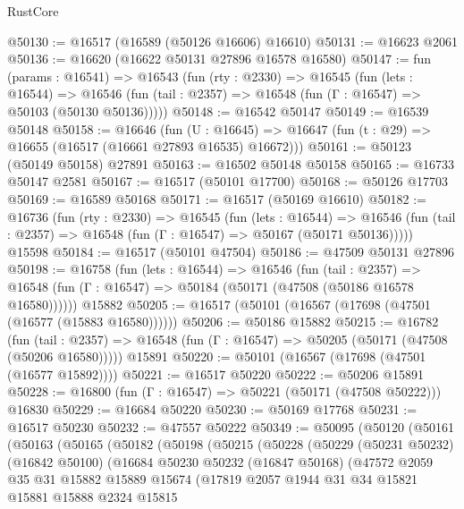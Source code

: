 \begin{lexlean}{RustCore}
\begin{coremodule}
@50130 := @16517 (@16589 (@50126 @16606) @16610)
@50131 := @16623 @2061
@50136 := @16620 (@16622 @50131 @27896 @16578 @16580)
@50147 := fun (params : @16541) =>
  @16543
    (fun (rty : @2330) =>
    @16545
      (fun (lets : @16544) =>
      @16546 (fun (tail : @2357) => @16548 (fun (Γ : @16547) => @50103 (@50130 @50136)))))
@50148 := @16542 @50147
@50149 := @16539 @50148
@50158 := @16646
    (fun (U : @16645) => @16647 (fun (t : @29) => @16655 (@16517 (@16661 @27893 @16535) @16672)))
@50161 := @50123 (@50149 @50158) @27891
@50163 := @16502 @50148 @50158
@50165 := @16733 @50147 @2581
@50167 := @16517 (@50101 @17700)
@50168 := @50126 @17703
@50169 := @16589 @50168
@50171 := @16517 (@50169 @16610)
@50182 := @16736
    (fun (rty : @2330) =>
    @16545
      (fun (lets : @16544) =>
      @16546 (fun (tail : @2357) => @16548 (fun (Γ : @16547) => @50167 (@50171 @50136)))))
    @15598
@50184 := @16517 (@50101 @47504)
@50186 := @47509 @50131 @27896
@50198 := @16758
    (fun (lets : @16544) =>
    @16546
      (fun (tail : @2357) =>
      @16548 (fun (Γ : @16547) => @50184 (@50171 (@47508 (@50186 @16578 @16580))))))
    @15882
@50205 := @16517 (@50101 (@16567 (@17698 (@47501 (@16577 (@15883 @16580))))))
@50206 := @50186 @15882
@50215 := @16782
    (fun (tail : @2357) => @16548 (fun (Γ : @16547) => @50205 (@50171 (@47508 (@50206 @16580)))))
    @15891
@50220 := @50101 (@16567 (@17698 (@47501 (@16577 @15892))))
@50221 := @16517 @50220
@50222 := @50206 @15891
@50228 := @16800 (fun (Γ : @16547) => @50221 (@50171 (@47508 @50222))) @16830
@50229 := @16684 @50220
@50230 := @50169 @17768
@50231 := @16517 @50230
@50232 := @47557 @50222
@50349 := @50095
    (@50120
      (@50161
        (@50163
          (@50165
            (@50182
              (@50198
                (@50215
                  (@50228
                    (@50229
                      (@50231 @50232)
                      (@16842 @50100)
                      (@16684
                        @50230
                        @50232
                        (@16847 @50168)
                        (@47572
                          @2059
                          @35
                          @31
                          @15882
                          @15889
                          @15674
                          (@17819
                            @2057
                            @1944
                            @31
                            @34
                            @15821
                            @15881
                            @15888
                            @2324
                            @15815

\end{coremodule}
\end{lexlean}
